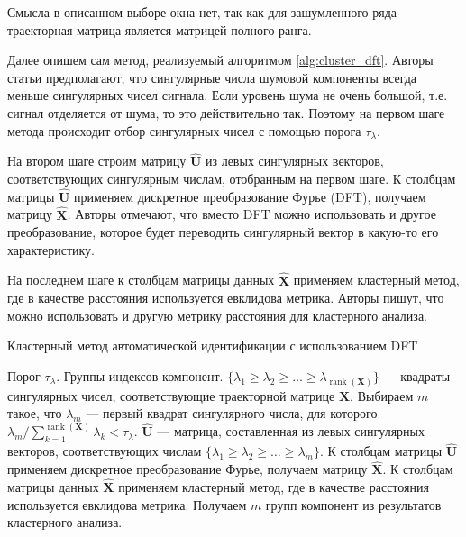 \documentclass[specialist,
               substylefile = spbu.rtx,
               subf,href,colorlinks=true, 12pt]{disser}
\def\rank{\mathop{\mathrm{rank}}}
\begin{document}
Смысла в описанном выборе окна нет, так как для зашумленного ряда траекторная матрица является матрицей полного ранга.

Далее опишем сам метод, реализуемый алгоритмом \ref{alg:cluster_dft}.
Авторы статьи предполагают, что сингулярные числа шумовой компоненты всегда меньше сингулярных чисел сигнала.
Если уровень шума не очень большой, т.е. сигнал отделяется от шума, то это действительно так. Поэтому на первом шаге метода происходит отбор сингулярных чисел с помощью порога $\tau_\lambda$.

На втором шаге строим матрицу  $\mathbf{\hat U}$ из левых сингулярных векторов, соответствующих сингулярным числам, отобранным на первом шаге. К столбцам матрицы $\mathbf{\hat U}$ применяем дискретное преобразование Фурье (DFT), получаем матрицу $\mathbf{\hat X}$. Авторы отмечают, что вместо DFT можно использовать и другое преобразование, которое будет переводить сингулярный вектор в какую-то его характеристику.

На последнем шаге к столбцам матрицы данных $\mathbf{\hat X}$ применяем кластерный метод, где в качестве расстояния используется евклидова метрика. Авторы пишут, что можно использовать и другую метрику расстояния для кластерного анализа.

 \begin{algorithm}[!hhh]
\caption{Кластерный метод автоматической идентификации с использованием DFT}
\label{alg:cluster_dft}
\begin{algorithmic}[1]
\REQUIRE Порог $\tau_\lambda$.
\ENSURE Группы индексов компонент.
\STATE  $\{ \lambda_1 \geqslant \lambda_2 \geqslant \ldots \geqslant \lambda_{\rank(\mathbf{X})}\}$ --- квадраты сингулярных чисел, соответствующие траекторной матрице $\mathbf{X}$. Выбираем $m$ такое, что $\lambda_m$ --- первый квадрат сингулярного числа, для которого $\lambda_m / \sum_{k=1}^{\rank(\mathbf{X})}\lambda_k < \tau_\lambda$.
\STATE $\mathbf{\hat U}$ --- матрица, составленная из левых сингулярных векторов, соответствующих числам $\{ \lambda_1 \geqslant \lambda_2 \geqslant \ldots \geqslant \lambda_m\}$. К столбцам матрицы $\mathbf{\hat U}$ применяем дискретное преобразование Фурье, получаем матрицу $\mathbf{\hat X}$.
\STATE К столбцам матрицы данных $\mathbf{\hat X}$ применяем кластерный метод, где в качестве расстояния используется евклидова метрика.
\STATE Получаем $m$ групп компонент из результатов кластерного анализа.
\end{algorithmic}
\end{algorithm}
\end{document}
